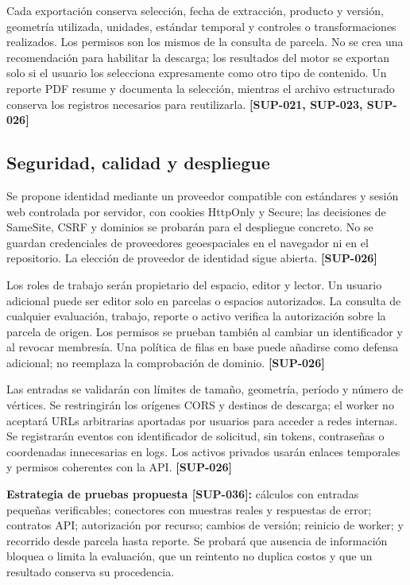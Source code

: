 \documentclass[10pt,a4paper]{article}
\begin{document}
Cada exportación conserva selección, fecha de extracción, producto y versión, geometría utilizada, unidades, estándar temporal y controles o transformaciones realizados. Los permisos son los mismos de la consulta de parcela. No se crea una recomendación para habilitar la descarga; los resultados del motor se exportan solo si el usuario los selecciona expresamente como otro tipo de contenido. Un reporte PDF resume y documenta la selección, mientras el archivo estructurado conserva los registros necesarios para reutilizarla. \textbf{[SUP-021, SUP-023, SUP-026]}


\subsection{Seguridad, calidad y despliegue}

Se propone identidad mediante un proveedor compatible con estándares y sesión web controlada por servidor, con cookies HttpOnly y Secure; las decisiones de SameSite, CSRF y dominios se probarán para el despliegue concreto. No se guardan credenciales de proveedores geoespaciales en el navegador ni en el repositorio. La elección de proveedor de identidad sigue abierta. \textbf{[SUP-026]}


Los roles de trabajo serán propietario del espacio, editor y lector. Un usuario adicional puede ser editor solo en parcelas o espacios autorizados. La consulta de cualquier evaluación, trabajo, reporte o activo verifica la autorización sobre la parcela de origen. Los permisos se prueban también al cambiar un identificador y al revocar membresía. Una política de filas en base puede añadirse como defensa adicional; no reemplaza la comprobación de dominio. \textbf{[SUP-026]}


Las entradas se validarán con límites de tamaño, geometría, período y número de vértices. Se restringirán los orígenes CORS y destinos de descarga; el worker no aceptará URLs arbitrarias aportadas por usuarios para acceder a redes internas. Se registrarán eventos con identificador de solicitud, sin tokens, contraseñas o coordenadas innecesarias en logs. Los activos privados usarán enlaces temporales y permisos coherentes con la API. \textbf{[SUP-026]}


\textbf{Estrategia de pruebas propuesta [SUP-036]:} cálculos con entradas pequeñas verificables; conectores con muestras reales y respuestas de error; contratos API; autorización por recurso; cambios de versión; reinicio de worker; y recorrido desde parcela hasta reporte. Se probará que ausencia de información bloquea o limita la evaluación, que un reintento no duplica costos y que un resultado conserva su procedencia.
\end{document}
